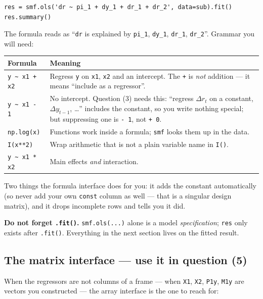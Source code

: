 \documentclass[11pt]{article}
\newcommand{\code}[1]{\texttt{#1}}
\begin{document}
\begin{lstlisting}
res = smf.ols('dr ~ pi_1 + dy_1 + dr_1 + dr_2', data=sub).fit()
res.summary()
\end{lstlisting}

\noindent The formula reads as ``\code{dr} is explained by \code{pi\_1},
\code{dy\_1}, \code{dr\_1}, \code{dr\_2}''. Grammar you will need:

\begin{center}
\begin{tabular}{@{}p{3.3cm}p{12.1cm}@{}}
\toprule
\textbf{Formula} & \textbf{Meaning} \\
\midrule
\code{y \textasciitilde\ x1 + x2} & Regress \code{y} on \code{x1}, \code{x2} and an intercept. The \code{+} is \emph{not} addition --- it means ``include as a regressor''. \\
\code{y \textasciitilde\ x1 - 1} & No intercept. Question (3) needs this: ``regress $\Delta r_t$ on a constant, $\Delta y_{t-1}$, \ldots'' includes the constant, so you write nothing special; but suppressing one is \code{- 1}, not \code{+ 0}. \\
\code{np.log(x)} & Functions work inside a formula; \code{smf} looks them up in the data. \\
\code{I(x**2)} & Wrap arithmetic that is not a plain variable name in \code{I()}. \\
\code{y \textasciitilde\ x1 * x2} & Main effects \emph{and} interaction. \\
\bottomrule
\end{tabular}
\end{center}

\noindent Two things the formula interface does for you: it adds the constant
automatically (so never add your own \code{const} column as well --- that is a
singular design matrix), and it drops incomplete rows and tells you it did.

\noindent\textbf{Do not forget \code{.fit()}.}
\code{smf.ols(...)} alone is a model \emph{specification}; \code{res} only exists
after \code{.fit()}. Everything in the next section lives on the fitted result.

\subsection{The matrix interface --- use it in question (5)}

When the regressors are not columns of a frame --- when \code{X1}, \code{X2},
\code{P1y}, \code{M1y} are vectors you constructed --- the array interface is
the one to reach for:
\end{document}
